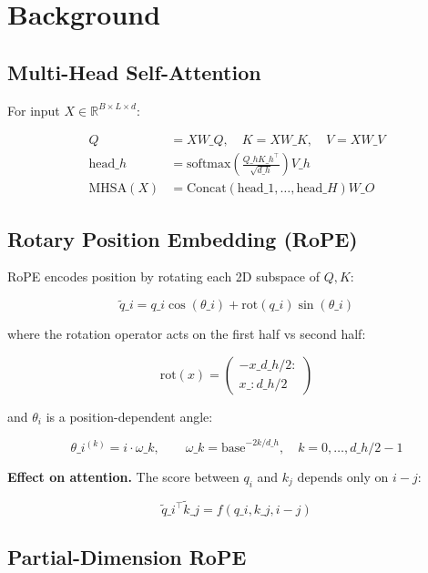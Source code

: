 
\section{Background}

\subsection{Multi-Head Self-Attention}

For input $X \in \mathbb{R}^{B \times L \times d}$:

\[
\begin{aligned}
Q &= X W\_Q, \quad K = X W\_K, \quad V = X W\_V \\
\text{head}\_h &= \mathrm{softmax}\!\left(\frac{Q\_h K\_h^\top}{\sqrt{d\_h}}\right) V\_h \\
\text{MHSA}(X) &= \mathrm{Concat}(\text{head}\_1, \dots, \text{head}\_H) W\_O
\end{aligned}
\tag{3.1}
\]

\subsection{Rotary Position Embedding (RoPE)}

RoPE encodes position by rotating each 2D subspace of $Q, K$:

\[
\tilde{q}\_i = q\_i \cos(\theta\_i) + \mathrm{rot}(q\_i) \sin(\theta\_i)
\tag{3.2}
\]

where the rotation operator acts on the first half vs second half:

\[
\mathrm{rot}(x) = \begin{pmatrix} -x\_{d\_h/2:} \\ x\_{:d\_h/2} \end{pmatrix}
\tag{3.3}
\]

and $\theta_i$ is a position-dependent angle:

\[
\theta\_i^{(k)} = i \cdot \omega\_k, \qquad
\omega\_k = \mathrm{base}^{-2k/d\_h}, \quad k = 0, \dots, d\_h/2 - 1
\tag{3.4}
\]

\textbf{Effect on attention.} The score between $q_i$ and $k_j$ depends only on 
$i - j$:

\[
\tilde{q}\_i^\top \tilde{k}\_j = f(q\_i, k\_j, i - j)
\tag{3.5}
\]

\subsection{Partial-Dimension RoPE}

